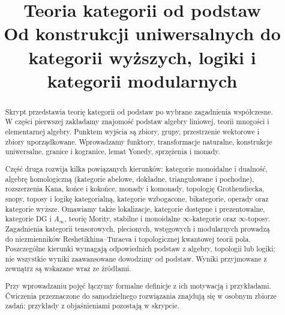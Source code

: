 \documentclass[11pt,a4paper]{article}
\title{\textbf{Teoria kategorii od podstaw}\\\large Od konstrukcji uniwersalnych do kategorii wyższych, logiki i kategorii modularnych}
\author{}
\date{}
\numberwithin{equation}{section}
\theoremstyle{plain}
\theoremstyle{definition}
\theoremstyle{remark}
\begin{document}
\maketitle
\begin{abstract}
Skrypt przedstawia teorię kategorii od podstaw po wybrane zagadnienia współczesne. W części pierwszej zakładamy znajomość podstaw algebry liniowej, teorii mnogości i elementarnej algebry. Punktem wyjścia są zbiory, grupy, przestrzenie wektorowe i zbiory uporządkowane. Wprowadzamy funktory, transformacje naturalne, konstrukcje uniwersalne, granice i kogranice, lemat Yonedy, sprzężenia i monady.

Część druga rozwija kilka powiązanych kierunków: kategorie monoidalne i dualność, algebrę homologiczną (kategorie abelowe, dokładne, triangulowane i pochodne), rozszerzenia Kana, końce i kokońce, monady i komonady, topologię Grothendiecka, snopy, toposy i logikę kategorialną, kategorie wzbogacone, bikategorie, operady oraz kategorie wyższe. Omawiamy także lokalizacje, kategorie dostępne i prezentowalne, kategorie DG i $A_\infty$, teorię Mority, stabilne i monoidalne $\infty$-kategorie oraz $\infty$-toposy. Zagadnienia kategorii tensorowych, plecionych, wstęgowych i modularnych prowadzą do niezmienników Reshetikhina--Turaeva i topologicznej kwantowej teorii pola. Poszczególne kierunki wymagają odpowiednich podstaw z algebry, topologii lub logiki; nie wszystkie wyniki zaawansowane dowodzimy od podstaw. Wyniki przyjmowane z zewnątrz są wskazane wraz ze źródłami.

Przy wprowadzaniu pojęć łączymy formalne definicje z ich motywacją i przykładami. Ćwiczenia przeznaczone do samodzielnego rozwiązania znajdują się w osobnym zbiorze zadań; przykłady z objaśnieniami pozostają w skrypcie.
\end{abstract}
\tableofcontents
\newpage
\end{document}
